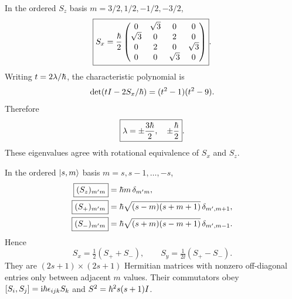In the ordered $S_z$ basis
$m=3/2,1/2,-1/2,-3/2$,
\begin{equation}
\boxed{S_x=\frac{\hbar}2
\begin{pmatrix}
0&\sqrt3&0&0\\
\sqrt3&0&2&0\\
0&2&0&\sqrt3\\
0&0&\sqrt3&0
\end{pmatrix}}.
\end{equation}
Writing $t=2\lambda/\hbar$, the
characteristic polynomial is
\begin{equation}
\det(tI-2S_x/\hbar)
=(t^2-1)(t^2-9).
\end{equation}
Therefore
\begin{equation}
\boxed{\lambda=\pm\frac{3\hbar}{2},
\quad\pm\frac{\hbar}2}.
\end{equation}
These eigenvalues agree with rotational
equivalence of $S_x$ and $S_z$.

In the ordered $\lvert s,m\rangle$ basis
$m=s,s-1,\ldots,-s$,
\begin{align}
\boxed{(S_z)_{m'm}}&=
\hbar m\,\delta_{m'm},\\
\boxed{(S_+)_{m'm}}&=
\hbar\sqrt{(s-m)(s+m+1)}\,
\delta_{m',m+1},\\
\boxed{(S_-)_{m'm}}&=
\hbar\sqrt{(s+m)(s-m+1)}\,
\delta_{m',m-1}.
\end{align}
Hence
\begin{equation}
\boxed{S_x=\tfrac12(S_++S_-),\qquad
S_y=\tfrac1{2\ii}(S_+-S_-)}.
\end{equation}
They are $(2s+1)\times(2s+1)$ Hermitian
matrices with nonzero off-diagonal entries
only between adjacent $m$ values.
Their commutators obey
$[S_i,S_j]=\mathrm i\hbar\epsilon_{ijk}S_k$
and $S^2=\hbar^2s(s+1)I$.
